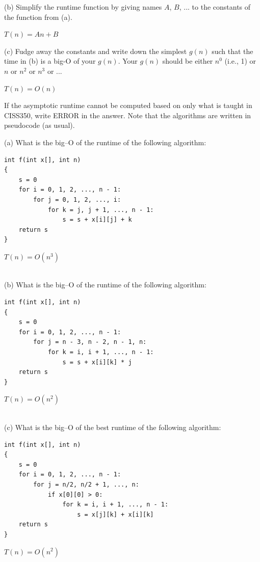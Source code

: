 (b) Simplify the runtime function by giving names $A$, $B$, ...
to the constants of the function from (a).
\\
\ANSWER
\begin{answerlong}
$T(n) = An + B$
\end{answerlong}

(c) Fudge away the constants and write down the simplest $g(n)$ such 
that the time in (b) is a big-O of your $g(n)$.
Your $g(n)$ should be either $n^0$ (i.e., 1) or $n$ or $n^2$ or $n^3$ or ...
\\
\ANSWER
\begin{answerlong}
$T(n) = O(n)$
\end{answerlong}

\newpage
\nextq %

If the asymptotic runtime cannot be computed based on only what is taught in CISS350,
write ERROR in the answer.
Note that the algorithms are written in pseudocode (as usual).

(a)
What is the big--O of the runtime of the following algorithm:
\begin{Verbatim}[frame=single]
int f(int x[], int n)
{
    s = 0
    for i = 0, 1, 2, ..., n - 1:
        for j = 0, 1, 2, ..., i:
            for k = j, j + 1, ..., n - 1:
                s = s + x[i][j] + k
    return s
}
\end{Verbatim}
\ANSWER
\begin{answerlong}
$T(n) = O(n^3)$
\end{answerlong}


\mbox{}\\
(b)
What is the big--O of the runtime of the following algorithm:
\begin{Verbatim}[frame=single]
int f(int x[], int n)
{
    s = 0
    for i = 0, 1, 2, ..., n - 1:
        for j = n - 3, n - 2, n - 1, n:
            for k = i, i + 1, ..., n - 1:
                s = s + x[i][k] * j
    return s
}
\end{Verbatim}
\ANSWER
\begin{answerlong}
$T(n) = O(n^2)$
\end{answerlong}


\mbox{}\\
(c)
What is the big--O of the best runtime of the following algorithm:
\begin{Verbatim}[frame=single]
int f(int x[], int n)
{
    s = 0
    for i = 0, 1, 2, ..., n - 1:
        for j = n/2, n/2 + 1, ..., n:
            if x[0][0] > 0:
                for k = i, i + 1, ..., n - 1:
                    s = x[j][k] + x[i][k]
    return s
}
\end{Verbatim}
\ANSWER
\begin{answerlong}
$T(n) = O(n^2)$
\end{answerlong}


